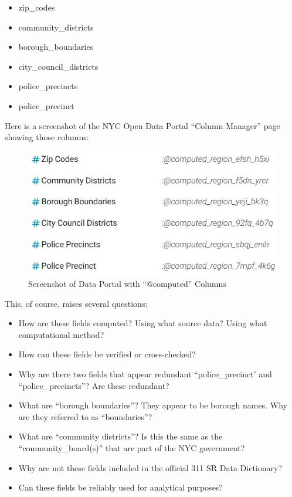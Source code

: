 \documentclass[12pt, titlepage]{article}
\begin{document}
\begin{itemize}
	\item zip\_codes
	\item community\_districts
	\item borough\_boundaries
	\item city\_council\_districts
	\item police\_precincts
	\item police\_precinct 
\end{itemize}	

Here is a screenshot of the NYC Open Data Portal ``Column Manager'' 
page showing those columns:

\begin{figure}[tbp]
  \centering
 	\includegraphics[width = .65\textwidth] {computed_fields_jpg.jpg}	
	\caption{Screenshot of Data Portal with ``@computed'' Columns}  
	\label{fig:computed-columns}
\end{figure}

This, of course, raises several questions:

\begin{itemize}
	\item How are these fields computed? Using what source data? 
	Using what computational method?
	\item How can these fields be verified or cross-checked?
	\item Why are there two fields that appear redundant ``police\_precinct' 
	and ``police\_precincts''? Are these redundant?
	\item What are ``borough boundaries''? They appear to be borough names. 
	Why are they referred to as ``boundaries''?
	\item What are ``community districts''? Is this the same as the
	 ``community\_board(s)'' that are part of the NYC government?
	\item Why are not these fields included in the official 311 SR Data Dictionary?
	\item Can these fields be reliably used for analytical purposes? 
\end{itemize}	
\end{document}
